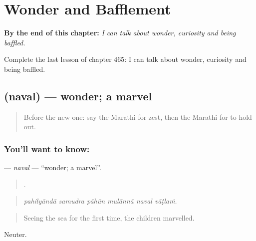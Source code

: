 
\chapter{Wonder and Bafflement}
\label{ch:mr-wonder-and-bafflement}

\begin{chapteropening}
\textbf{By the end of this chapter:} \emph{I can talk about wonder, curiosity and being baffled.}

Complete the last lesson of chapter 465: I can talk about wonder, curiosity and being baffled.
\end{chapteropening}

\section[\texorpdfstring{\mr{नवल} (naval)}{नवल (naval)}]{ (naval) — wonder; a marvel}

\label{lesson:MR-C465-naval}



\begin{quote}
Before the new one: say the Marathi for zest, then the Marathi for to hold out.
\end{quote}

\subsection*{You'll want to know: }
\textbf{} — \emph{naval} — \textquotedblleft{}wonder; a marvel\textquotedblright{}.

\begin{quote}
     .
\end{quote}

\begin{quote}
\emph{pahilyāndā samudra pāhūn mulānnā naval vāṭlaṁ.}
\end{quote}

\begin{quote}
Seeing the sea for the first time, the children marvelled.
\end{quote}

Neuter.


